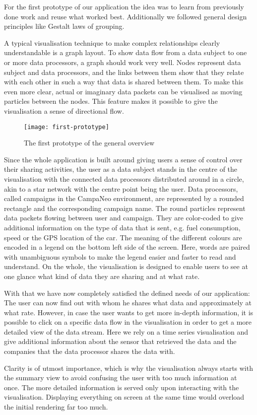 \documentclass[../paper.tex]{subfiles}
\begin{document}
  For the first prototype of our application the idea was to learn from
  previously done work and reuse what worked best. Additionally we followed
  general design principles like Gestalt laws \cite{wiki:principles_of_grouping}
  of grouping.

  A typical visualisation technique to make complex relationships clearly
  understandable is a graph layout. To show data flow from a data subject to one
  or more data processors, a graph should work very well. Nodes represent data
  subject and data processors, and the links between them show that they relate
  with each other in such a way that data is shared between them. To make this
  even more clear, actual or imaginary data packets can be visualised as moving
  particles between the nodes.  This feature makes it possible to give the
  visualisation a sense of directional flow.

  \begin{figure}
    \centering
    \texttt{[image: first-prototype]}
    \caption{The first prototype of the general overview}
    \label{fig:prototype}
  \end{figure}

  Since the whole application is built around giving users a sense of control
  over their sharing activities, the user as a data subject stands in the centre of
  the visualisation with the connected data processors distributed around in a
  circle, akin to a star network \cite{wiki:star_network} with the centre point
  being the user. Data processors, called campaigns in the CampaNeo environment, are
  represented by a rounded rectangle and the corresponding campaign name. The round
  particles represent data packets flowing between user and campaign. They are
  color-coded to give additional information on the type of data that is sent,
  e.g. fuel consumption, speed or the GPS location of the car.
  The meaning of the different colours are encoded in a legend on the bottom left
  side of the screen. Here, words are paired with unambiguous symbols to make the
  legend easier and faster to read and understand. On the whole, the visualisation
  is designed to enable users to see at one glance what kind of data they are sharing
  and at what rate.

  With that we have now completely satisfied the defined needs of our application:
  The user can now find out with whom he shares what data and approximately at what
  rate. However, in case the user wants to get more in-depth information, it is
  possible to click on a specific data flow in the visualisation in order
  to get a more detailed view of the data stream. Here we rely on a time series
  visualisation and give additional information about the sensor that retrieved
  the data and the companies that the data processor shares the data with.

  Clarity is of utmost importance, which is why the visualisation always starts
  with the summary view to avoid confusing the user with too much information
  at once. The more detailed information is served only upon interacting with
  the visualisation. Displaying everything on screen at the same time would
  overload the initial rendering far too much.
\end{document}
